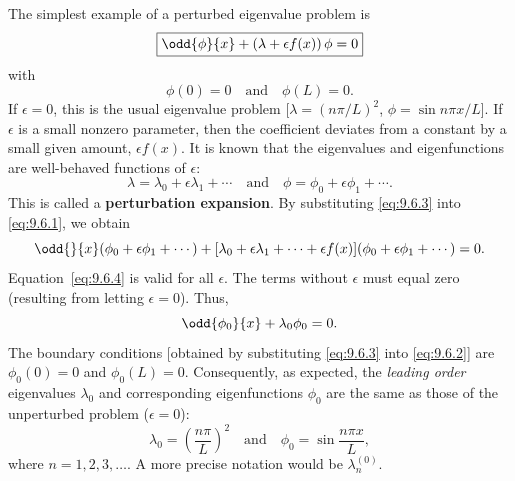 The simplest example of a perturbed eigenvalue problem is
\begin{equation}
\label{eq:9.6.1}
\boxed{\odd{\phi}{x} + (\lambda + \epsilon f(x))\,\phi = 0}
\end{equation}
with
\begin{equation}
\label{eq:9.6.2}
\phi(0) = 0 \quad\text{and}\quad \phi(L) = 0.
\end{equation}
If $\epsilon = 0$, this is the usual eigenvalue problem [$\lambda = (n\pi/L)^2$, $\phi = \sin n\pi x/L$].  If $\epsilon$ is a small nonzero parameter, then the coefficient deviates from a constant by a small given amount, $\epsilon f(x)$.  It is known that the eigenvalues and eigenfunctions are well-behaved functions of $\epsilon$:
\begin{equation}
\label{eq:9.6.3}
\lambda = \lambda_0 + \epsilon\lambda_1 + \cdots \quad\text{and}\quad \phi = \phi_0 + \epsilon\phi_1 + \cdots.
\end{equation}
This is called a \textbf{perturbation expansion}.  By substituting \eqref{eq:9.6.3} into \eqref{eq:9.6.1}, we obtain
\begin{equation}
\label{eq:9.6.4}
\odd{}{x}(\phi_0+\epsilon\phi_1+\cdots) + [\lambda_0+\epsilon\lambda_1+\cdots+\epsilon f(x)](\phi_0+\epsilon\phi_1+\cdots) = 0.
\end{equation}
Equation~\eqref{eq:9.6.4} is valid for all $\epsilon$.  The terms without $\epsilon$ must equal zero (resulting from letting $\epsilon = 0$).  Thus,
\begin{equation}
\label{eq:9.6.5}
\odd{\phi_0}{x} + \lambda_0\phi_0 = 0.
\end{equation}
The boundary conditions [obtained by substituting \eqref{eq:9.6.3} into \eqref{eq:9.6.2}] are $\phi_0(0) = 0$ and $\phi_0(L) = 0$.  Consequently, as expected, the \emph{leading order} eigenvalues $\lambda_0$ and corresponding eigenfunctions $\phi_0$ are the same as those of the unperturbed problem ($\epsilon = 0$):
\begin{equation}
\label{eq:9.6.6}
\lambda_0 = \left(\frac{n\pi}{L}\right)^2 \quad\text{and}\quad \phi_0 = \sin\frac{n\pi x}{L},
\end{equation}
where $n = 1,2,3,\ldots$.  A more precise notation would be $\lambda_n^{(0)}$.

